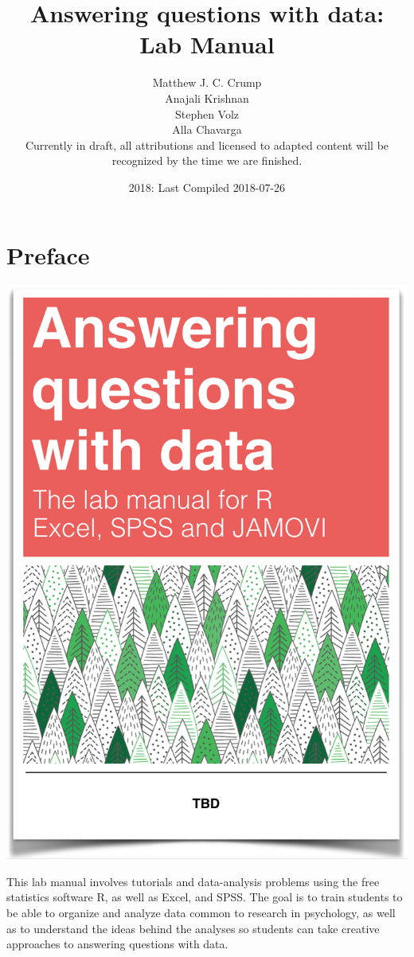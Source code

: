 \documentclass[]{book}
\title{Answering questions with data: Lab Manual}
\author{Matthew J. C. Crump \\ Anajali Krishnan \\ Stephen Volz \\ Alla Chavarga \\ Currently in draft, all attributions and licensed to adapted content
will be recognized by the time we are finished.}
\date{2018: Last Compiled 2018-07-26}
\theoremstyle{definition}
\theoremstyle{definition}
\theoremstyle{definition}
\theoremstyle{remark}
\begin{document}
\maketitle

{
\setcounter{tocdepth}{1}
\tableofcontents
}
\chapter*{Preface}\label{preface}

\begin{center}\includegraphics[width=12.5in]{LabmanualCover} \end{center}

This lab manual involves tutorials and data-analysis problems using the
free statistics software R, as well as Excel, and SPSS. The goal is to
train students to be able to organize and analyze data common to
research in psychology, as well as to understand the ideas behind the
analyses so students can take creative approaches to answering questions
with data.
\end{document}

